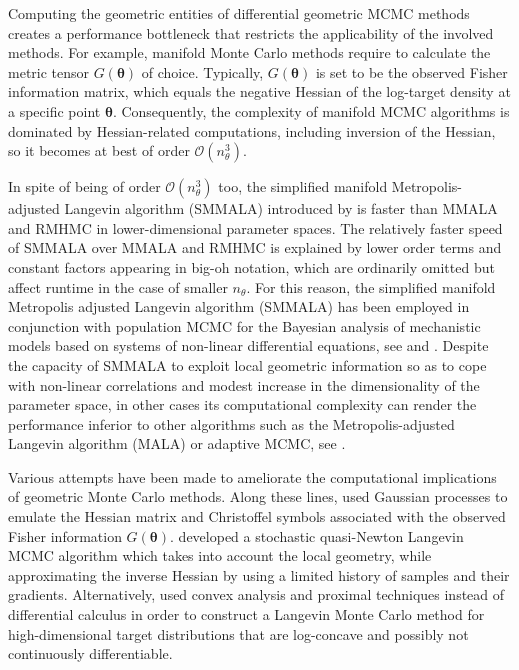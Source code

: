 \documentclass[twoside,11pt]{article}
\begin{document}
Computing the geometric entities of differential geometric MCMC methods creates a performance bottleneck that restricts the 
applicability of the involved methods. For example, manifold Monte Carlo methods require to calculate the metric tensor
$G(\boldsymbol{\theta})$ of choice. Typically, $G(\boldsymbol{\theta})$ is set to be the observed Fisher information matrix,
which equals the negative Hessian of the log-target density at a specific point $\boldsymbol{\theta}$.
Consequently, the complexity of manifold MCMC algorithms is dominated by Hessian-related computations, including inversion of
the Hessian, so it becomes at best of order $\mathcal{O}(n_\theta^3)$.

In spite of being of order $\mathcal{O}(n_\theta^3)$ too, the simplified manifold Metropolis-adjusted Langevin algorithm 
(SMMALA) introduced by \cite{gir_cal__rie} is faster than MMALA and RMHMC in lower-dimensional parameter spaces. The 
relatively faster speed of SMMALA over MMALA and RMHMC is explained by lower order terms and constant factors appearing in 
big-oh notation, which are ordinarily omitted but affect runtime in the case of smaller $n_\theta$. For this reason, the 
simplified manifold Metropolis adjusted Langevin algorithm (SMMALA) has been employed in conjunction with population MCMC 
for the Bayesian analysis of mechanistic models based on systems of non-linear differential equations, see 
\cite{cal_gir__sta} and \cite{sch_pap__ews}. Despite the capacity of SMMALA to exploit local geometric information so as to 
cope with non-linear correlations and modest increase in the dimensionality of the parameter space, in other cases its 
computational complexity can render the performance inferior to other algorithms such as the Metropolis-adjusted Langevin 
algorithm (MALA) or adaptive MCMC, see \cite{cal_eps_sil__bay}.

Various attempts have been made to ameliorate the computational implications of geometric Monte Carlo methods. Along these 
lines, \cite{lan_tha_chr__emu} used Gaussian processes to emulate the Hessian matrix and Christoffel symbols associated with 
the observed Fisher information $G(\boldsymbol{\theta})$. \cite{sim_bad_cem__sto} developed a stochastic quasi-Newton 
Langevin MCMC algorithm which takes into account the local geometry, while approximating the inverse Hessian by using a 
limited history of samples and their gradients. Alternatively, \cite{per__prox} used convex analysis and proximal techniques 
instead of differential calculus in order to construct a Langevin Monte Carlo method for high-dimensional target 
distributions that are log-concave and possibly not continuously differentiable.
\end{document}
